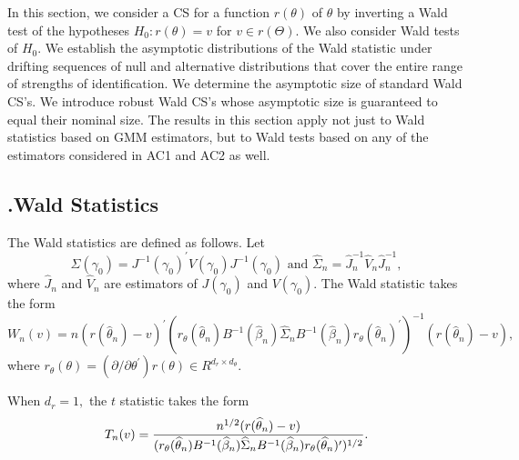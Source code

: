 \documentclass[12pt,titlepage,final,oneside,letterpaper]{article}
\begin{document}
\setcounter{equation}{0}\hspace{0.25in}In this section, we consider a CS for
a function $r(\theta )$ of $\theta $ by inverting a Wald test of the
hypotheses $H_{0}:r(\theta )=v$ for $v\in r(\Theta ).$ We also consider Wald
tests of $H_{0}.$ We establish the asymptotic distributions of the Wald
statistic under drifting sequences of null and alternative distributions
that cover the entire range of strengths of identification. We determine the
asymptotic size of standard Wald CS's. We introduce robust Wald CS's whose
asymptotic size is guaranteed to equal their nominal size. The results in
this section apply not just to Wald statistics based on GMM estimators, but
to Wald tests based on any of the estimators considered in AC1 and AC2 as
well.

\subsection{\hspace{-0.23in}\textbf{.}\hspace{0.18in}Wald Statistics}

\hspace{0.25in}The Wald statistics are defined as follows. Let%
\begin{equation}
\Sigma (\gamma _{0})=J^{-1}\left( \gamma _{0}\right) ^{\prime }V(\gamma
_{0})J^{-1}(\gamma _{0})\text{ and }\widehat{\Sigma }_{n}=\widehat{J}%
_{n}^{-1}\widehat{V}_{n}\widehat{J}_{n}^{-1},  \label{Variance Matrix Defns}
\end{equation}%
where $\widehat{J}_{n}$ and $\widehat{V}_{n}$ are estimators of $J(\gamma
_{0})$ and $V(\gamma _{0}).$ The Wald statistic takes the form%
\begin{equation}
W_{n}(v)=n(r(\widehat{\theta }_{n})-v)^{\prime }(r_{\theta }(\widehat{\theta 
}_{n})B^{-1}(\widehat{\beta }_{n})\widehat{\Sigma }_{n}B^{-1}(\widehat{\beta 
}_{n})r_{\theta }(\widehat{\theta }_{n})^{\prime })^{-1}(r(\widehat{\theta }%
_{n})-v),  \label{Defn Wald}
\end{equation}%
where $r_{\theta }(\theta )=(\partial /\partial \theta ^{\prime })r(\theta
)\in R^{d_{r}\times d_{\theta }}.$

When $d_{r}=1,$ the $t$ statistic takes the form%
\begin{equation}
T_{n}(v)=\frac{n^{1/2}(r(\widehat{\theta }_{n})-v)}{(r_{\theta }(\widehat{%
\theta }_{n})B^{-1}(\widehat{\beta }_{n})\widehat{\Sigma }_{n}B^{-1}(%
\widehat{\beta }_{n})r_{\theta }(\widehat{\theta }_{n})^{\prime })^{1/2}}.
\label{Defn T}
\end{equation}
\end{document}

